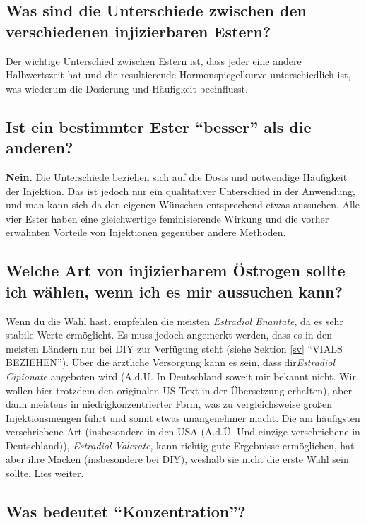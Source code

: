 \documentclass{article}
\begin{document}
\subsection{Was sind die Unterschiede zwischen den verschiedenen injizierbaren Estern?}

Der wichtige Unterschied zwischen Estern ist, dass jeder eine andere Halbwertszeit hat und die resultierende Hormonspiegelkurve unterschiedlich ist, was wiederum die Dosierung und Häufigkeit beeinflusst.

\subsection{Ist ein bestimmter Ester “besser” als die anderen?}

\textbf{Nein.} Die Unterschiede beziehen sich auf die Dosis und notwendige Häufigkeit der Injektion. Das ist jedoch nur ein qualitativer Unterschied in der Anwendung, und man kann sich da den eigenen Wünschen entsprechend etwas aussuchen. Alle vier Ester haben eine gleichwertige feminisierende Wirkung und die vorher erwähnten Vorteile von Injektionen gegenüber andere Methoden. 

\subsection{Welche Art von injizierbarem Östrogen sollte ich wählen, wenn ich es mir aussuchen kann?}

Wenn du die Wahl hast, empfehlen die meisten \textit{Estradiol Enantate}, da es sehr stabile Werte ermöglicht. Es muss jedoch angemerkt werden, dass es in den meisten Ländern nur bei DIY zur Verfügung steht (siehe Sektion \ref{sv} “VIALS BEZIEHEN”). Über die ärztliche Versorgung kann es sein, dass dir\textit{Estradiol Cipionate} angeboten wird (A.d.Ü. In Deutschland soweit mir bekannt nicht. Wir wollen hier trotzdem den originalen US Text in der Übersetzung erhalten), aber dann meistens in niedrigkonzentrierter Form, was zu vergleichsweise großen Injektionsmengen führt und somit etwas unangenehmer macht. Die am häufigsten verschriebene Art (insbesondere in den USA (A.d.Ü. Und einzige verschriebene in Deutschland)), \textit{Estradiol Valerate}, kann richtig gute Ergebnisse ermöglichen, hat aber ihre Macken (insbesondere bei DIY), weshalb sie nicht die erste Wahl sein sollte. Lies weiter.

\subsection{Was bedeutet “Konzentration”?}
\end{document}
